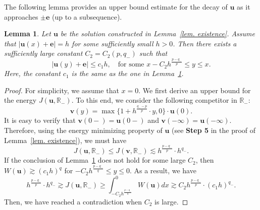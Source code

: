 \documentclass[11pt,twoside,reqno]{amsart}
\newcounter{assu}
\newtheorem{lemma}{Lemma}[section]
\numberwithin{equation}{section}
\begin{document}
The following lemma provides an upper bound estimate for the decay of $\mathbf{u}$ as it approaches $\pm\mathbf{e}$ (up to a subsequence).

\begin{lemma}\label{lem. upper bound (subsequence)}
    Let $\mathbf{u}$ be the solution constructed in Lemma~\ref{lem. existence}. Assume that $|\mathbf{u}(x)+\mathbf{e}|=h$ for some sufficiently small $h>0$. Then there exists a sufficiently large constant $C_{2}=C_{2}(p,q_{-})$ such that
    \begin{equation*}
        |\mathbf{u}(y)+\mathbf{e}|\leq c_{1}h,\quad\mbox{for some }x-C_{2}h^{\frac{p-q_{-}}{p}}\leq y\leq x.
    \end{equation*}
    Here, the constant $c_{1}$ is the same as the one in Lemma~\ref{lem. upper bound (subsequence)}.
\end{lemma}
\begin{proof}
    For simplicity, we assume that $x=0$. We first derive an upper bound for the energy $J(\mathbf{u},\mathbb{R}_{-})$. To this end, we consider the following competitor in $\mathbb{R}_{-}$:
    \begin{equation*}
        \mathbf{v}(y)=\max\{1+h^{\frac{q_{-}-p}{p}}\cdot y,0\}\cdot \mathbf{u}(0).
    \end{equation*}
    It is easy to verify that $\mathbf{v}(0-)=\mathbf{u}(0-)$ and $\mathbf{v}(-\infty)=\mathbf{u}(-\infty)$. Therefore, using the energy minimizing property of $\mathbf{u}$ (see \textbf{Step 5} in the proof of Lemma~\ref{lem. existence}), we must have
    \begin{equation*}
        J(\mathbf{u},\mathbb{R}_{-})\leq J(\mathbf{v},\mathbb{R}_{-})\lesssim h^{\frac{p-q_{-}}{p}}\cdot h^{q_{-}}.
    \end{equation*}
    If the conclusion of Lemma~\ref{lem. upper bound (subsequence)} does not hold for some large $C_{2}$, then $W(\mathbf{u})\gtrsim(c_{1}h)^{q}$ for $-C_{2}h^{\frac{p-q_{-}}{q}}\leq y\leq0$. As a result, we have
    \begin{equation*}
        h^{\frac{p-q_{-}}{p}}\cdot h^{q_{-}}\gtrsim J(\mathbf{u},\mathbb{R}_{-})\geq\int_{-C_{2}h^{\frac{p-q_{-}}{q}}}^{0}W(\mathbf{u}) dx\gtrsim C_{2}h^{\frac{p-q_{-}}{p}}\cdot(c_{1}h)^{q_{-}}.
    \end{equation*}
    Then, we have reached a contradiction when $C_{2}$ is large.
\end{proof}
\end{document}
